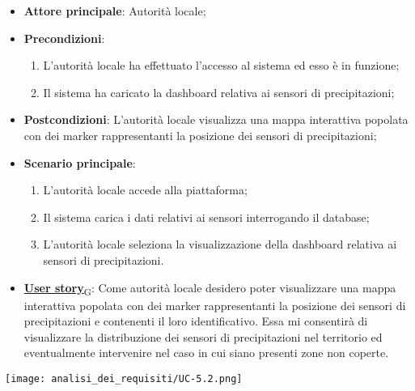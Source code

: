 \begin{itemize}
	\item \textbf{Attore principale}: Autorità locale;
	\item \textbf{Precondizioni}:
	      \begin{enumerate}
		      \item L'autorità locale ha effettuato l'accesso al sistema ed esso è in funzione;
		      \item Il sistema ha caricato la dashboard relativa ai sensori di precipitazioni;
	      \end{enumerate}
	\item \textbf{Postcondizioni}: L'autorità locale visualizza una mappa interattiva popolata con dei marker rappresentanti la posizione dei sensori di precipitazioni;
	\item \textbf{Scenario principale}:
	      \begin{enumerate}
		      \item L'autorità locale accede alla piattaforma;
		      \item Il sistema carica i dati relativi ai sensori interrogando il database;
		      \item L'autorità locale seleziona la visualizzazione della dashboard relativa ai sensori di precipitazioni.
	      \end{enumerate}
	\item \href{https://7last.github.io/docs/rtb/documentazione-interna/glossario\#user-story}{\textbf{User story}\textsubscript{G}}:
	      Come autorità locale desidero poter visualizzare una mappa interattiva popolata con dei marker rappresentanti la posizione dei sensori di precipitazioni
	      e contenenti il loro identificativo. Essa mi consentirà di visualizzare la distribuzione dei sensori di precipitazioni nel territorio ed
	      eventualmente intervenire nel caso in cui siano presenti zone non coperte.
\end{itemize}
\begin{center}
	\texttt{[image: analisi\_dei\_requisiti/UC-5.2.png]}
\end{center}


